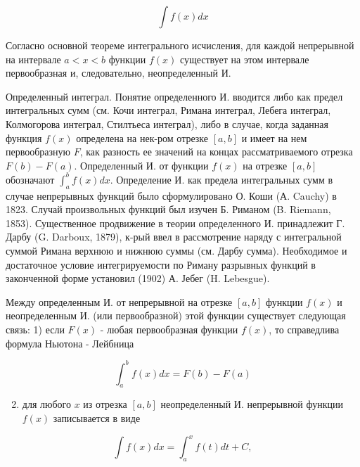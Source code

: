 \documentclass[10pt]{article}
\begin{document}
\[

\int f(x) d x

\]



Согласно основной теореме интегрального исчисления, для каждой непрерывной на интервале $a<x<b$ функции $f(x)$ существует на этом интервале первообразная и, следовательно, неопределенный $И$.



Определенный интеграл. Понятие определенного И. вводится либо как предел интегральных сумм (см. Кочи интеграл, Римана интеграл, Лебега интеграл, Колмогорова интеграл, Стилтьеса интеграл), либо в случае, когда заданная функция $f(x)$ определена на нек-ром отрезке $[a, b]$ и имеет на нем первообразную $F$, как разность ее значений на концах рассматриваемого отрезка $F(b)-F(a)$. Определенный И. от функции $f(x)$ на отрезке $[a, b]$ обозначают $\int_{a}^{b} f(x) d x$. Определение И. как предела интегральных сумм в случае непрерывных функций было сформулировано О. Коши (А. Cauchy) в 1823. Случай произвольных функций был изучен Б. Риманом (B. Riemann, 1853). Существенное продвижение в теории определенного И. принадлежит Г. Дарбу (G. Darboux, 1879), к-рый ввел в рассмотрение наряду с интегральной суммой Римана верхнюю и нижнюю суммы (см. Дарбу сумма). Необходимое и достаточное условие интегрируемости по Риману разрывных функций в законченной форме установил (1902) А. Јебег (H. Lebesgue).



Между определенным И. от непрерывной на отрезке $[a, b]$ функции $f(x)$ и неопределенным И. (или первообразной) этой функции существует следующая связь: 1) если $F(x)$ - любая первообразная функции $f(x)$, то справедлива формула Ньютона - Лейбница



\[

\int_{a}^{b} f(x) d x=F(b)-F(a)

\]



\begin{enumerate}

  \setcounter{enumi}{1}

  \item для любого $x$ из отрезка $[a, b]$ неопределенный И. непрерывной функции $f(x)$ записывается в виде

\end{enumerate}



\[

\int f(x) d x=\int_{a}^{x} f(t) d t+C,

\]
\end{document}
